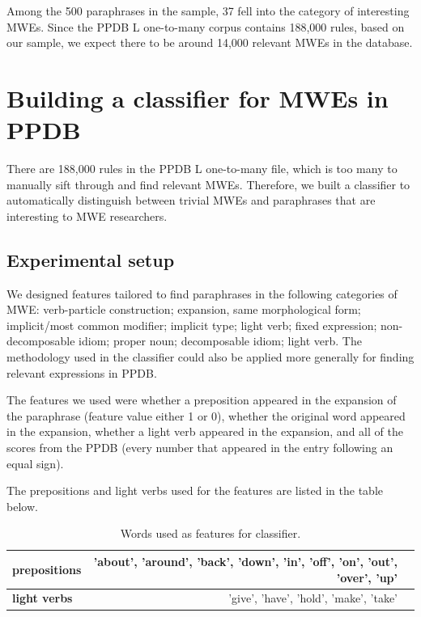 \documentclass[11pt]{article}
\begin{document}
\begin{itemize}
Among the 500 paraphrases in the sample, 37 fell into the category of interesting MWEs. Since the PPDB L one-to-many corpus contains 188,000 rules, based on our sample, we expect there to be around 14,000 relevant MWEs in the database.

\section{Building a classifier for MWEs in PPDB}

There are 188,000 rules in the PPDB L one-to-many file, which is too many to manually sift through and find relevant MWEs. Therefore, we built a classifier to automatically distinguish between trivial MWEs and paraphrases that are interesting to MWE researchers.

\subsection{Experimental setup}

We designed features tailored to find paraphrases in the following categories of MWE: verb-particle construction; expansion, same morphological form; implicit/most common modifier; implicit type; light verb; fixed expression; non-decomposable idiom; proper noun; decomposable idiom; light verb. The methodology used in the classifier could also be applied more generally for finding relevant expressions in PPDB.

The features we used were whether a preposition appeared in the expansion of the paraphrase (feature value either 1 or 0), whether the original word appeared in the expansion, whether a light verb appeared in the expansion, and all of the scores from the PPDB (every number that appeared in the entry following an equal sign).

The prepositions and light verbs used for the features are listed in the table below.

\begin{center}
\begin{table}
{\small
\hfill{}
\begin{tabular}{|l|rl|}
\hline \bf prepositions &  'about', 'around', 'back', 'down', 'in', 'off', 'on', 'out', 'over', 'up'  &\\ \hline
\bf light verbs &  'give', 'have', 'hold', 'make', 'take' &\\
\hline
\end{tabular}}
\hfill{}
\caption{\label{font-table} Words used as features for classifier. }
\end{table}
\end{center}


\end{itemize}
\end{document}
